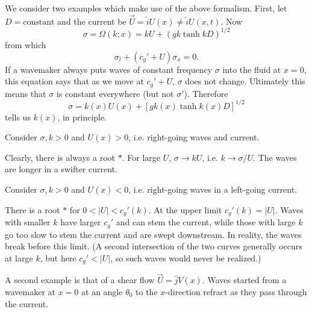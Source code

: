 We consider two examples which make use of the above formalism. First, let
$D=\text{constant}$ and the current be $\vec U=\hat iU(x)\ne\hat iU(x,t)$. Now
\[
	\sigma=\Omega(k;x)=kU+(gk\tanh kD)^{1/2}
\]
from which
\[
	\sigma_t+(c_g'+U)\sigma_x=0.
\]
If a wavemaker always puts waves of constant frequency $\sigma$ into the fluid at $x=0$, this
equation says that as we move at $c_g'+U$, $\sigma$ does not change. Ultimately this means
that $\sigma$ is constant everywhere (but not $\sigma'$). Therefore
\[
	\sigma=k(x)U(x)+[gk(x)\tanh k(x)D]^{1/2}
\]
tells us $k(x)$, in principle.

Consider $\sigma,k>0$ and $U(x)>0$, i.e. right-going waves and current.


Clearly, there is always a root $*$. For large $U$, $\sigma\to kU$, i.e. $k\to\sigma/U$. The waves are
longer in a swifter current.

\sourcepagebreak

Consider $\sigma,k>0$ and $U(x)<0$, i.e. right-going waves in a left-going current.


There is a root $*$ for $0<|U|<c_g'(k)$. At the upper limit $c_g'(k)=|U|$. Waves with
smaller $k$ have larger $c_g'$ and can stem the current, while those with large $k$ go too slow
to stem the current and are swept downstream. In reality, the waves break before this
limit. (A second intersection of the two curves generally occurs at large $k$, but here
$c_g'<|U|$, so such waves would never be realized.)

A second example is that of a shear flow $\vec U=\hat jV(x)$. Waves started from a
wavemaker at $x=0$ at an angle $\theta_0$ to the $x$-direction refract as they pass through the
current.

\sourcepagebreak



